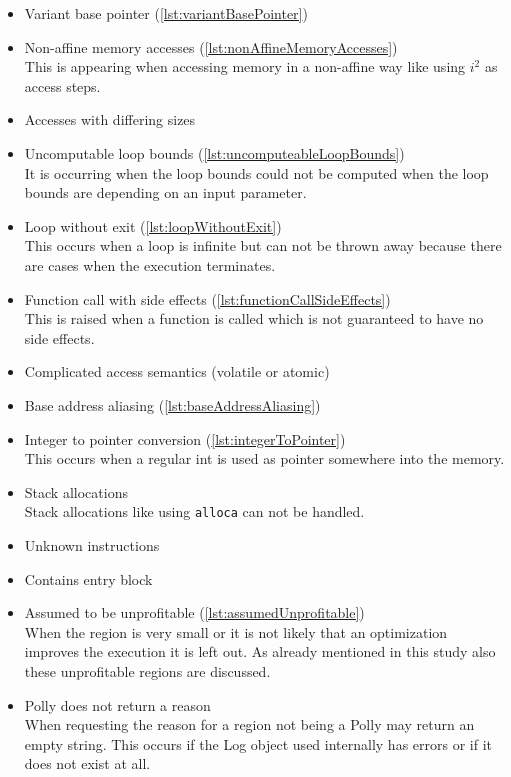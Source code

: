 \begin{itemize}
    \item Variant base pointer (\autoref{lst:variantBasePointer})\\
    \item Non-affine memory accesses (\autoref{lst:nonAffineMemoryAccesses})\\
        This is appearing when accessing memory in a non-affine way like using \(i^2\) as access steps.
    \item Accesses with differing sizes\\
    \item Uncomputable loop bounds (\autoref{lst:uncomputeableLoopBounds})\\
        It is occurring when the loop bounds could not be computed \eg when the loop bounds are depending on an input parameter.
    \item Loop without exit (\autoref{lst:loopWithoutExit})\\
        This occurs when a loop is infinite but can not be thrown away because there are cases when the execution terminates.
    \item Function call with side effects (\autoref{lst:functionCallSideEffects})\\
        This is raised when a function is called which is not guaranteed to have no side effects.
    \item Complicated access semantics (volatile or atomic)\\
    \item Base address aliasing (\autoref{lst:baseAddressAliasing})\\
    \item Integer to pointer conversion (\autoref{lst:integerToPointer})\\
        This occurs when a regular int is used as pointer somewhere into the memory.
    \item Stack allocations\\
        Stack allocations like using \texttt{alloca} can not be handled.
    \item Unknown instructions\\
    \item Contains entry block\\
    \item Assumed to be unprofitable (\autoref{lst:assumedUnprofitable})\\
        When the region is very small or it is not likely that an optimization improves the execution it is left out.
        As already mentioned in this study also these unprofitable regions are discussed.
    \item Polly does not return a reason\\
        When requesting the reason for a region not being a \scop Polly may return an empty string.
        This occurs if the Log object used internally has errors or if it does not exist at all.
\end{itemize}

